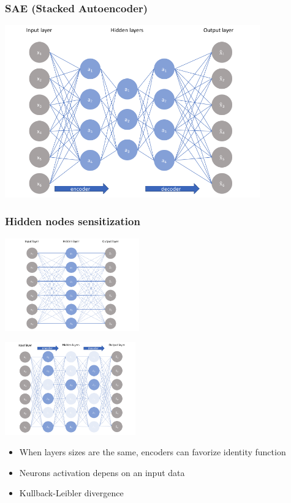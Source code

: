 \documentclass{beamer}
\begin{document}
\begin{frame}
\frametitle{SAE (Stacked Autoencoder)}
\includegraphics[width=11cm]{sae2.png}
\end{frame}

\begin{frame}
\frametitle{Hidden nodes sensitization}
\begin{minipage}{0.475\textwidth}
\includegraphics[height=4cm]{sae3.png}
\end{minipage}\hspace{10pt}
\begin{minipage}{0.475\textwidth}
\includegraphics[height=4cm]{sae4.png}
\end{minipage}
\vspace{1cm}
\begin{itemize}
\item When layers sizes are the same, encoders can favorize identity function
\item Neurons activation depens on an input data
\item Kullback-Leibler divergence
\end{itemize}
\end{frame}
\end{document}
